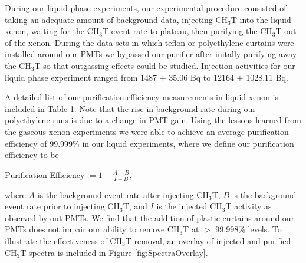 During our liquid phase experiments, our experimental procedure consisted of taking an adequate amount of background data, injecting CH$_3$T into the liquid xenon, waiting for the CH$_3$T event rate to plateau, then purifying the CH$_3$T out of the xenon.  During the data sets in which teflon or polyethylene curtains were installed around our PMTs we bypassed our purifier after initally purifying away the CH$_3$T so that outgassing effects could be studied.  Injection activities for our liquid phase experiment ranged from 1487 $\pm$ 35.06 Bq to 12164 $\pm$ 1028.11 Bq.  

A detailed list of our purification efficiency measurements in liquid xenon is included in Table 1.  Note that the rise in background rate during our polyethylene runs is due to a change in PMT gain.  Using the lessons learned from the gaseous xenon experiments we were able to achieve an average purification efficiency of 99.999\% in our liquid experiments, where we define our purification efficiency to be

\begin{center}
Purification Efficiency $= 1 - \frac{A - B}{I - B},$
\end{center}

\noindent
where $A$ is the background event rate after injecting CH$_3$T, $B$ is the background event rate prior to injecting CH$_3$T, and $I$ is the injected CH$_3$T activity as observed by out PMTs.  We find that the addition of plastic curtains around our PMTs does not impair our ability to remove CH$_3$T at $>$ 99.998\% levels.  To illustrate the effectiveness of CH$_3$T removal, an overlay of injected and purified CH$_3$T spectra is included in Figure \ref{fig:SpectraOverlay}.  

